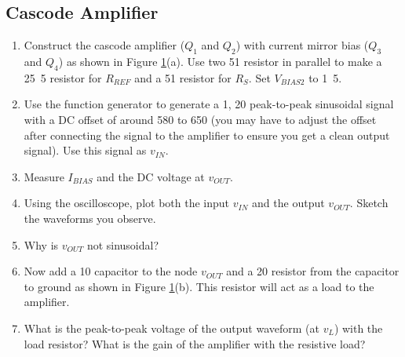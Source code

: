 \documentclass{article}
\begin{document}
\subsection{Cascode Amplifier}

\begin{enumerate}

	\begin{figure}[!htb]
		
		\centerline{\box\graph}
		\caption{(a) Cascode amplifier test setup  (b) Cascode amplifier test setup with load resistance}
		\label{cascode}
	\end{figure}
	
	\item Construct the cascode amplifier ($Q_1$ and $Q_2$) with current mirror bias ($Q_3$ and $Q_4$) as shown in Figure \ref{cascode}(a). Use two \unit{51}{\kilo\ohm} resistor in parallel to make a \unit{25.5}{\kilo\ohm} resistor for $R_{REF}$ and a \unit{51}{\ohm} resistor for $R_S$. Set $V_{BIAS2}$ to \unit{1.5}{\volt}.

	\item Use the function generator to generate a \unit{1}{\kilo\hertz}, \unit{20}{\milli\volt} peak-to-peak sinusoidal signal with a DC offset of around \unit{580}{\milli\volt} to \unit{650}{\milli\volt} (you may have to adjust the offset after connecting the signal to the amplifier to ensure you get a clean output signal). Use this signal as $v_{IN}$. 
	
	\item Measure $I_{BIAS}$ and the DC voltage at $v_{OUT}$.

	\item Using the oscilloscope, plot both the input $v_{IN}$ and the output $v_{OUT}$. Sketch the waveforms you observe.

	\item Why is $v_{OUT}$ not sinusoidal? 
	
	\item Now add a \unit{10}{\micro\farad} capacitor to the node $v_{OUT}$ and a \unit{20}{\kilo\ohm} resistor from the capacitor to ground as shown in Figure \ref{cascode}(b). This resistor will act as a load to the amplifier. 

	\item What is the peak-to-peak voltage of the output waveform (at $v_L$) with the load resistor? What is the gain of the amplifier with the resistive load? 

	\end{enumerate}
\end{document}
